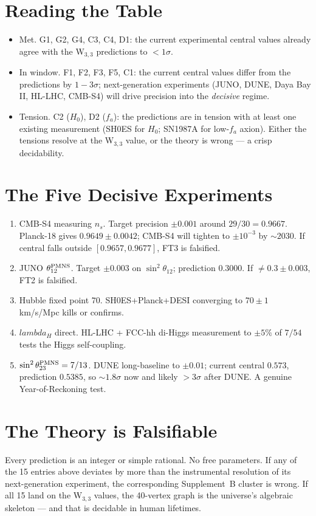\documentclass[12pt,a4paper]{article}
\def\textbf#1{#1}%
\def\lambda{lambda}%
\theoremstyle{definition}
\begin{document}
\section*{Reading the Table}
\begin{itemize}[leftmargin=2em]
\item \textbf{Met.} G1, G2, G4, C3, C4, D1: the current experimental
central values already agree with the W$_{3,3}$ predictions to $<1\sigma$.
\item \textbf{In window.} F1, F2, F3, F5, C1: the current central values
differ from the predictions by $1{-}3\sigma$; next-generation experiments
(JUNO, DUNE, Daya Bay II, HL-LHC, CMB-S4) will drive precision into the
\emph{decisive} regime.
\item \textbf{Tension.} C2 ($H_0$), D2 ($f_a$): the predictions are in
tension with at least one existing measurement (SH0ES for $H_0$; SN1987A for
low-$f_a$ axion). Either the tensions resolve at the W$_{3,3}$ value, or
the theory is wrong --- a crisp decidability.
\end{itemize}

\section*{The Five Decisive Experiments}
\begin{enumerate}[leftmargin=2em]
\item \textbf{CMB-S4 measuring $n_s$.} Target precision $\pm 0.001$
around $29/30=0.9667$. Planck-18 gives $0.9649\pm 0.0042$; CMB-S4 will
tighten to $\pm 10^{-3}$ by $\sim 2030$. If central falls outside
$[0.9657, 0.9677]$, FT3 is falsified.
\item \textbf{JUNO $\theta_{12}^{\rm PMNS}$.} Target $\pm 0.003$ on
$\sin^2\theta_{12}$; prediction $0.3000$. If $\ne 0.3\pm 0.003$,
FT2 is falsified.
\item \textbf{Hubble fixed point $70$.} SH0ES+Planck+DESI converging
to $70\pm 1$ km/s/Mpc kills or confirms.
\item \textbf{$\lambda_H$ direct.} HL-LHC + FCC-hh di-Higgs measurement
to $\pm 5\%$ of $7/54$ tests the Higgs self-coupling.
\item \textbf{$\sin^2\theta_{23}^{\rm PMNS}=7/13$.} DUNE long-baseline
to $\pm 0.01$; current central $0.573$, prediction $0.5385$, so $\sim 1.8\sigma$
now and likely $> 3\sigma$ after DUNE. A genuine Year-of-Reckoning test.
\end{enumerate}

\section*{The Theory is Falsifiable}
Every prediction is an integer or simple rational. No free parameters.
If any of the 15 entries above deviates by more than the instrumental
resolution of its next-generation experiment, the corresponding Supplement~B
cluster is wrong. If all 15 land on the W$_{3,3}$ values, the 40-vertex
graph is the universe's algebraic skeleton --- and that is decidable in
human lifetimes.
\end{document}
